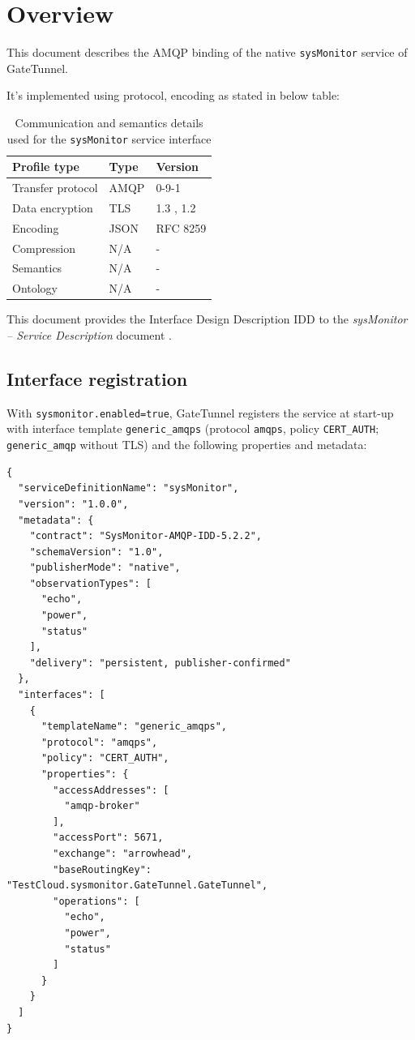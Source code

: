 \documentclass[a4paper]{arrowhead}
\begin{document}
\section{Overview}
\label{sec:overview}

This document describes the AMQP binding of the native \texttt{sysMonitor} service of GateTunnel.

It's implemented using protocol, encoding as stated in below table:
\begin{table}[ht!]
  \centering
  \begin{tabular}{|l|l|l|}
    \hline
    \rowcolor{gray!33} Profile type & Type & Version \\ \hline
    Transfer protocol & AMQP & 0-9-1 \cite{amqp091} \\ \hline
    Data encryption & TLS & 1.3 \cite{rfc8446}, 1.2 \cite{rfc5246} \\ \hline
    Encoding & JSON & RFC 8259 \cite{rfc8259} \\ \hline
    Compression & N/A & - \\ \hline
    Semantics & N/A & - \\ \hline
    Ontology & N/A & - \\ \hline
  \end{tabular}
  \caption{Communication and semantics details used for the \texttt{sysMonitor} service interface}
  \label{tab:comunication_semantics_profile}
\end{table}

This document provides the Interface Design Description IDD to the \textit{sysMonitor -- Service Description} document \cite{gt-sysMonitor-sd}.

\subsection{Interface registration}

With \texttt{sysmonitor.enabled=true}, GateTunnel registers the service at start-up with interface template \texttt{generic\_\allowbreak{}amqps} (protocol \texttt{amqps}, policy \texttt{CERT\_\allowbreak{}AUTH}; \texttt{generic\_\allowbreak{}amqp} without TLS) and the following properties and metadata:

\begin{lstlisting}[caption={Registered service instance (TestCloud).}]
{
  "serviceDefinitionName": "sysMonitor",
  "version": "1.0.0",
  "metadata": {
    "contract": "SysMonitor-AMQP-IDD-5.2.2",
    "schemaVersion": "1.0",
    "publisherMode": "native",
    "observationTypes": [
      "echo",
      "power",
      "status"
    ],
    "delivery": "persistent, publisher-confirmed"
  },
  "interfaces": [
    {
      "templateName": "generic_amqps",
      "protocol": "amqps",
      "policy": "CERT_AUTH",
      "properties": {
        "accessAddresses": [
          "amqp-broker"
        ],
        "accessPort": 5671,
        "exchange": "arrowhead",
        "baseRoutingKey": "TestCloud.sysmonitor.GateTunnel.GateTunnel",
        "operations": [
          "echo",
          "power",
          "status"
        ]
      }
    }
  ]
}
\end{lstlisting}
\end{document}
